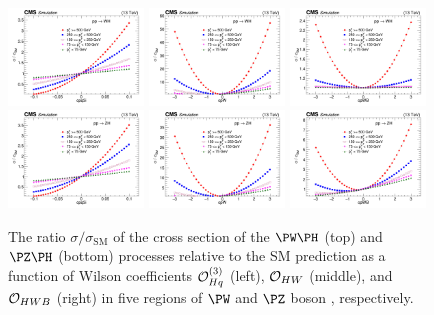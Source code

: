 \documentclass[a4paper,11pt]{article}
\begin{document}
\begin{figure}[t]
\begin{center}
\includegraphics[width=0.321\textwidth]{Figures/LHE/WH/Canv_cpq3i.png}
\includegraphics[width=0.321\textwidth]{Figures/LHE/WH/Canv_cpW.png}
\includegraphics[width=0.321\textwidth]{Figures/LHE/WH/Canv_cpWB.png}
\includegraphics[width=0.321\textwidth]{Figures/LHE/ZH/Canv_cpq3i.png}
\includegraphics[width=0.321\textwidth]{Figures/LHE/ZH/Canv_cpW.png}
\includegraphics[width=0.321\textwidth]{Figures/LHE/ZH/Canv_cpWB.png}
\end{center}
\caption{
The ratio $\sigma/\sigma_{\textrm{SM}}$ of the cross section of the $\PW\PH$ (top) and $\PZ\PH$ (bottom) processes relative to the SM prediction as a function of Wilson coefficients ${\cal O}^{(3)}_{Hq}$ (left), ${\cal O}_{HW}$ (middle), and ${\cal O}_{HWB}$ (right) in five regions of $\PW$ and $\PZ$ boson {\pt}, respectively.
}
\label{fig:LHE_WZH}
\end{figure}
\end{document}
